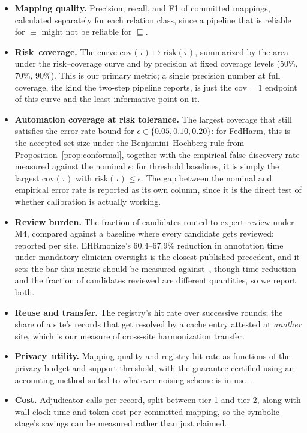 \documentclass[conference]{IEEEtran}
\begin{document}
\begin{itemize}
\item \textbf{Mapping quality.} Precision, recall, and F1 of committed mappings, calculated separately for each relation class, since a pipeline that is reliable for $\equiv$ might not be reliable for $\sqsubseteq$.
\item \textbf{Risk--coverage.} The curve $\mathrm{cov}(\tau) \mapsto \mathrm{risk}(\tau)$, summarized by the area under the risk--coverage curve and by precision at fixed coverage levels (50\%, 70\%, 90\%). This is our primary metric; a single precision number at full coverage, the kind the two-step pipeline reports, is just the $\mathrm{cov}=1$ endpoint of this curve and the least informative point on it.
\item \textbf{Automation coverage at risk tolerance.} The largest coverage that still satisfies the error-rate bound for $\epsilon \in \{0.05, 0.10, 0.20\}$: for FedHarm, this is the accepted-set size under the Benjamini--Hochberg rule from Proposition~\ref{prop:conformal}, together with the empirical false discovery rate measured against the nominal $\epsilon$; for threshold baselines, it is simply the largest $\mathrm{cov}(\tau)$ with $\mathrm{risk}(\tau) \le \epsilon$. The gap between the nominal and empirical error rate is reported as its own column, since it is the direct test of whether calibration is actually working.
\item \textbf{Review burden.} The fraction of candidates routed to expert review under M4, compared against a baseline where every candidate gets reviewed; reported per site. EHRmonize's 60.4--67.9\% reduction in annotation time under mandatory clinician oversight is the closest published precedent, and it sets the bar this metric should be measured against~\cite{b40}, though time reduction and the fraction of candidates reviewed are different quantities, so we report both.
\item \textbf{Reuse and transfer.} The registry's hit rate over successive rounds; the share of a site's records that get resolved by a cache entry attested at \emph{another} site, which is our measure of cross-site harmonization transfer.
\item \textbf{Privacy--utility.} Mapping quality and registry hit rate as functions of the privacy budget and support threshold, with the guarantee certified using an accounting method suited to whatever noising scheme is in use~\cite{b24}.
\item \textbf{Cost.} Adjudicator calls per record, split between tier-1 and tier-2, along with wall-clock time and token cost per committed mapping, so the symbolic stage's savings can be measured rather than just claimed.
\end{itemize}
\end{document}

